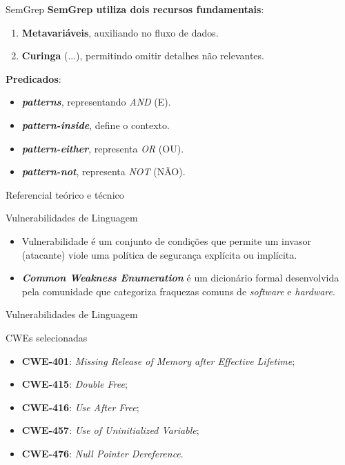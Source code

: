 \documentclass[
    aspectratio=169,   %
    12pt,
    brazil
]{beamer}
\newcommand{\minhaspaginas}{}
\begin{document}
\begin{frame}{SemGrep}
  \textbf{SemGrep utiliza dois recursos fundamentais}:
  \begin{enumerate}
    \item \textbf{Metavariáveis}, auxiliando no fluxo de dados.
    \item \textbf{Curinga} (...), permitindo omitir detalhes não relevantes.
  \end{enumerate}
  \textbf{Predicados}:
  \begin{itemize}
    \item \textbf{\textit{patterns}}, representando \textit{AND} (E).
    \item \textbf{\textit{pattern-inside}}, define o contexto.
    \item \textbf{\textit{pattern-either}}, representa \textit{OR} (OU).
    \item \textbf{\textit{pattern-not}}, representa \textit{NOT} (NÃO).
  \end{itemize}
\end{frame}

\renewcommand{\minhaspaginas}{\small 23 - 24}
\begin{frame}{Referencial teórico e técnico}
  \begin{block}{Vulnerabilidades de Linguagem}
    \begin{itemize}
      \item Vulnerabilidade é um conjunto de condições que permite um invasor (atacante) viole uma política de segurança explícita ou implícita.
      {\small \cite{seacord2013secure}}
    \item \textbf{\textit{Common Weakness Enumeration}} é um dicionário formal desenvolvida pela comunidade que categoriza fraquezas comuns de \textit{software} e \textit{hardware}.
      {\small \cite{mitrecwe}}
    \end{itemize}
  \end{block}
\end{frame}

\begin{frame}{Vulnerabilidades de Linguagem}
  \begin{block}{CWEs selecionadas}
    \begin{itemize}
      \item \textbf{CWE-401}: \textit{Missing Release of Memory after Effective Lifetime}; 
      \item \textbf{CWE-415}: \textit{Double Free}; 
      \item \textbf{CWE-416}: \textit{Use After Free}; 
      \item \textbf{CWE-457}: \textit{Use of Uninitialized Variable};
      \item \textbf{CWE-476}: \textit{Null Pointer Dereference}.
    \end{itemize}
  \end{block}
\end{frame}
\end{document}
